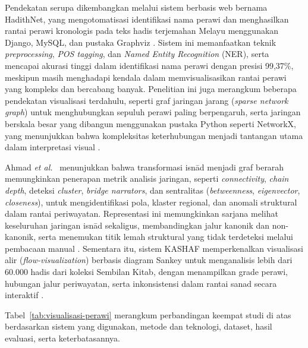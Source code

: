 Pendekatan serupa dikembangkan melalui sistem berbasis web bernama HadithNet, yang mengotomatisasi identifikasi nama perawi dan menghasilkan rantai perawi kronologis pada teks hadis terjemahan Melayu menggunakan Django, MySQL, dan pustaka Graphviz \cite{alias2024hadithnet}. Sistem ini memanfaatkan teknik \textit{preprocessing}, \textit{POS tagging}, dan \textit{Named Entity Recognition} (NER), serta mencapai akurasi tinggi dalam identifikasi nama perawi dengan presisi 99,37\%, meskipun masih menghadapi kendala dalam memvisualisasikan rantai perawi yang kompleks dan bercabang banyak. Penelitian ini juga merangkum beberapa pendekatan visualisasi terdahulu, seperti graf jaringan jarang (\textit{sparse network graph}) untuk menghubungkan sepuluh perawi paling berpengaruh, serta jaringan berskala besar yang dibangun menggunakan pustaka Python seperti NetworkX, yang menunjukkan bahwa kompleksitas keterhubungan menjadi tantangan utama dalam interpretasi visual \cite{alias2024hadithnet}.

Ahmad \textit{et al.}\ \cite{ahmad2025hadith} menunjukkan bahwa transformasi isnād menjadi graf berarah memungkinkan penerapan metrik analisis jaringan, seperti \textit{connectivity}, \textit{chain depth}, deteksi \textit{cluster}, \textit{bridge narrators}, dan sentralitas (\textit{betweenness}, \textit{eigenvector}, \textit{closeness}), untuk mengidentifikasi pola, klaster regional, dan anomali struktural dalam rantai periwayatan. Representasi ini memungkinkan sarjana melihat keseluruhan jaringan isnād sekaligus, membandingkan jalur kanonik dan non-kanonik, serta menemukan titik lemah struktural yang tidak terdeteksi melalui pembacaan manual \cite{ahmad2025hadith}. Sementara itu, sistem KASHAF memperkenalkan visualisasi alir (\textit{flow-visualization}) berbasis diagram Sankey untuk menganalisis lebih dari 60.000 hadis dari koleksi Sembilan Kitab, dengan menampilkan grade perawi, hubungan jalur periwayatan, serta inkonsistensi dalam rantai sanad secara interaktif \cite{shafie2021kashaf}.

Tabel~\ref{tab:visualisasi-perawi} merangkum perbandingan keempat studi di atas berdasarkan sistem yang digunakan, metode dan teknologi, dataset, hasil evaluasi, serta keterbatasannya.

